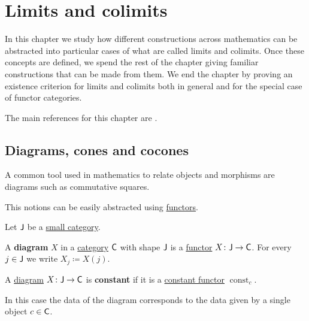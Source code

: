 \documentclass[../../main]{subfiles}
\begin{document}
\chapter{Limits and colimits}

In this chapter we study how different constructions across mathematics can be abstracted into particular cases of what are called limits and colimits.
Once these concepts are defined, we spend the rest of the chapter giving familiar constructions that can be made from them.
We end the chapter by proving an existence criterion for limits and colimits both in general and for the special case of functor categories.

The main references for this chapter are \cite{riehlCategoryTheoryContext, maclaneCategoriesWorkingMathematician1978, aluffiAlgebraChapter02009}.

\section{Diagrams, cones and cocones}

A common tool used in mathematics to relate objects and morphisms are diagrams such as commutative squares.
 
This notions can be easily abstracted using \hyperref[def:functor]{functors}.

\begin{definition}[Diagram]\label{def:diagram}
  Let \(\mathsf{J}\) be a \hyperref[def:small-category]{small category}.
  
  A \textbf{diagram} \(X\) in a \hyperref[def:category]{category} \(\mathsf{C}\) with shape \(\mathsf{J}\) is a \hyperref[def:functor]{functor} \(X\colon \mathsf{J} \to \mathsf{C}\).
  For every \(j \in \mathsf{J}\) we write \(X_{j} \coloneq X(j)\).
\end{definition}

\begin{example}\label{ex:constant-diagram}
  A \hyperref[def:diagram]{diagram} \(X\colon \mathsf{J} \to \mathsf{C}\) is \textbf{constant} if it is a \hyperref[ex:constant-functor]{constant functor} \(\operatorname{const}_{c}\).

  In this case the data of the diagram corresponds to the data given by a single object \(c \in \mathsf{C}\).
\end{example}
\end{document}

